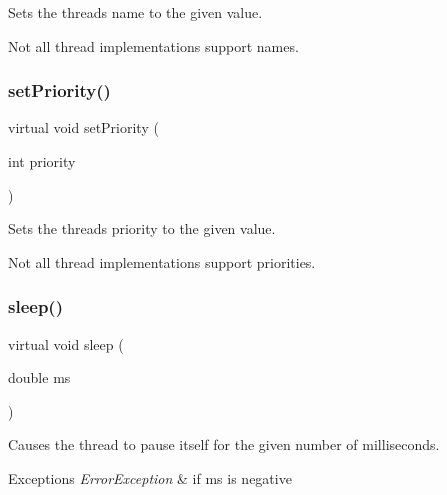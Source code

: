 Sets the thread\textquotesingle{}s name to the given value. 

Not all thread implementations support names. \mbox{\label{classsgl_1_1GThread_aa64e7a844400aed800a4f223da0d03d8}} 
\subsubsection{\texorpdfstring{set\+Priority()}{setPriority()}}
{\footnotesize\ttfamily virtual void set\+Priority (\begin{DoxyParamCaption}\item[{int}]{priority }\end{DoxyParamCaption})\hspace{0.3cm}{\ttfamily [pure virtual]}}



Sets the thread\textquotesingle{}s priority to the given value. 

Not all thread implementations support priorities. \mbox{\label{classsgl_1_1GThread_aa766a832061596446daffb891f42b71d}} 
\subsubsection{\texorpdfstring{sleep()}{sleep()}}
{\footnotesize\ttfamily virtual void sleep (\begin{DoxyParamCaption}\item[{double}]{ms }\end{DoxyParamCaption})\hspace{0.3cm}{\ttfamily [pure virtual]}}



Causes the thread to pause itself for the given number of milliseconds. 


\begin{DoxyExceptions}{Exceptions}
{\em Error\+Exception} & if ms is negative \\
\hline
\end{DoxyExceptions}
\mbox{\label{classsgl_1_1GThread_ac0ae5f26cd2001d772aed9d2ea97d41c}} 
